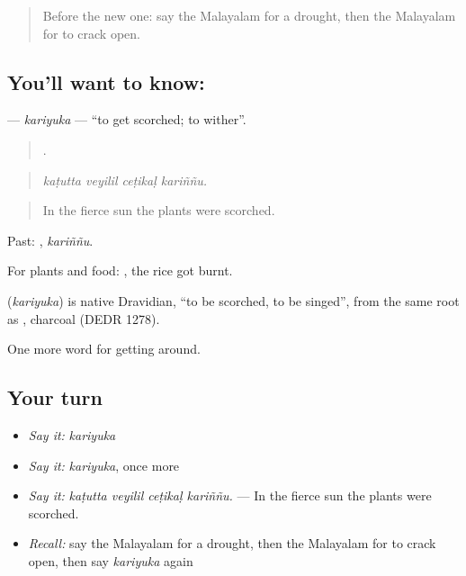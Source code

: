 \label{lesson:ML-C514-kariyuka}



\begin{quote}
Before the new one: say the Malayalam for a drought, then the Malayalam for to crack open.
\end{quote}

\subsection*{You'll want to know: }
\textbf{} — \emph{kariyuka} — \textquotedblleft{}to get scorched; to wither\textquotedblright{}.

\begin{quote}
   .
\end{quote}

\begin{quote}
\emph{kaṭutta veyilil ceṭikaḷ kariññu.}
\end{quote}

\begin{quote}
In the fierce sun the plants were scorched.
\end{quote}

Past: , \emph{kariññu}.

For plants and food:  , the rice got burnt.

\begin{cousinweb}
\textbf{} (\emph{kariyuka}) is native Dravidian, \textquotedblleft{}to be scorched, to be singed\textquotedblright{}, from the same root as , charcoal (DEDR 1278).
\end{cousinweb}

\begin{grammarlens}[title={What you've built}]
One more word for getting around.
\end{grammarlens}

\subsection*{Your turn}
\begin{itemize}
\raggedright
  \item \emph{Say it:} \emph{kariyuka}
  \item \emph{Say it:} \emph{kariyuka}, once more
  \item \emph{Say it:} \emph{kaṭutta veyilil ceṭikaḷ kariññu.} — In the fierce sun the plants were scorched.
  \item \emph{Recall:} say the Malayalam for a drought, then the Malayalam for to crack open, then say \emph{kariyuka} again
\end{itemize}

